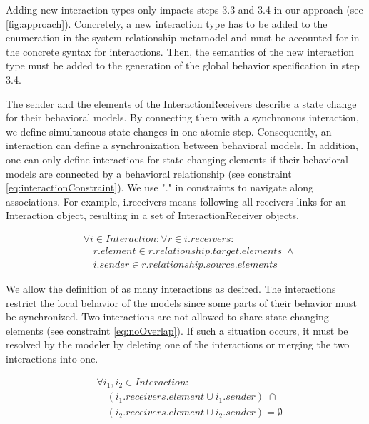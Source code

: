 \documentclass{jot}
\begin{document}
Adding new interaction types only impacts steps 3.3 and 3.4 in our approach (see \cref{fig:approach}).
Concretely, a new interaction type has to be added to the enumeration in the system relationship metamodel and must be accounted for in the concrete syntax for interactions.
Then, the semantics of the new interaction type must be added to the generation of the global behavior specification in step 3.4. 

The \textsf{sender} and the elements of the \textsf{InteractionReceiver}s describe a state change for their behavioral models.
By connecting them with a synchronous interaction, we define simultaneous state changes in one atomic step. 
Consequently, an interaction can define a synchronization between behavioral models.
In addition, one can only define interactions for state-changing elements if their behavioral models are connected by a behavioral relationship (see constraint \eqref{eq:interactionConstraint}).
We use "." in constraints to navigate along associations.
For example, \textsf{i.receivers} means following all \textsf{receivers} links for an \textsf{Interaction} object, resulting in a set of \textsf{InteractionReceiver} objects.

\begin{equation} \label{eq:interactionConstraint}
    \begin{aligned}
    & \forall i \in Interaction: \forall r \in i.receivers : \\
    & \quad r.element \in r.relationship.target.elements \; \wedge \\
    & \quad i.sender \in r.relationship.source.elements
    \end{aligned}
\end{equation}

We allow the definition of as many interactions as desired.
The interactions restrict the local behavior of the models since some parts of their behavior must be synchronized.
Two interactions are not allowed to share state-changing elements (see constraint \eqref{eq:noOverlap}).
If such a situation occurs, it must be resolved by the modeler by deleting one of the interactions or merging the two interactions into one.

\begin{equation} \label{eq:noOverlap}
    \begin{aligned}
    & \forall i_1,i_2 \in Interaction : \\
    & \quad (i_1.receivers.element \cup i_1.sender) \; \cap \\
    & \quad (i_2.receivers.element \cup i_2.sender) = \emptyset
    \end{aligned}
\end{equation}
\end{document}
